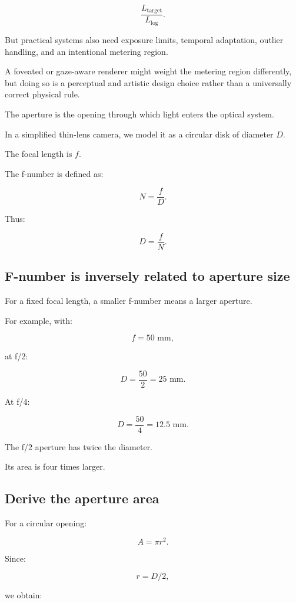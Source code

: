 \[ \frac{L_{\mathrm{target}}}{L_{\log}}. \]

But practical systems also need exposure limits, temporal adaptation, outlier handling, and an intentional metering region.

A foveated or gaze-aware renderer might weight the metering region differently, but doing so is a perceptual and artistic design choice rather than a universally correct physical rule.

The aperture is the opening through which light enters the optical system.

In a simplified thin-lens camera, we model it as a circular disk of diameter \(D\).

The focal length is \(f\).

The f-number is defined as:

\[ \boxed{ N=\frac fD. } \]

Thus:

\[ \boxed{ D=\frac fN. } \]

\subsection{F-number is inversely related to aperture size}\label{02-foundations-ii-ch036-f-number-is-inversely-related-to-aperture-size}

For a fixed focal length, a smaller f-number means a larger aperture.

For example, with:

\[ f=50\text{ mm}, \]

at f/2:

\[ D=\frac{50}{2}=\boxed{25\text{ mm}}. \]

At f/4:

\[ D=\frac{50}{4}=\boxed{12.5\text{ mm}}. \]

The f/2 aperture has twice the diameter.

Its area is four times larger.

\subsection{Derive the aperture area}\label{02-foundations-ii-ch036-derive-the-aperture-area}

For a circular opening:

\[ A=\pi r^2. \]

Since:

\[ r=D/2, \]

we obtain:

